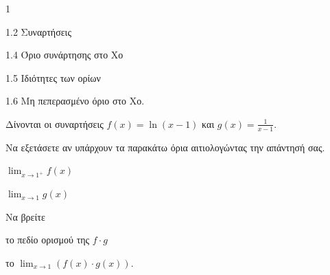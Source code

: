 \begin{ylh}{1}
    \item 1.2 Συναρτήσεις
    \item 1.4 Όριο συνάρτησης στο Χο
    \item 1.5 Ιδιότητες των ορίων
    \item 1.6 Μη πεπερασμένο όριο στο Χο.
\end{ylh}
Δίνονται οι συναρτήσεις $f(x) = \ln(x-1)$ και $g(x) = \frac{1}{x-1}$.
\begin{alist}
\item Να εξετάσετε αν υπάρχουν τα παρακάτω όρια αιτιολογώντας την απάντησή σας.
    \begin{rlist}
    \item $\lim_{x \to 1^+} f(x)$ 
    \item $\lim_{x \to 1} g(x)$ 
    \end{rlist}
\item Να βρείτε
    \begin{rlist}
    \item το πεδίο ορισμού της $f \cdot g$ 
    \item το $\lim_{x \to 1} (f(x) \cdot g(x))$. 
    \end{rlist}
\end{alist}
